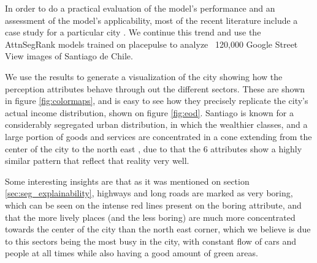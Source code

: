 In order to do a practical evaluation of the model's performance and an assessment
of the model's applicability, most of the recent literature include a case study
for  a particular city \cite{rossetti, zhang_measuring, zhang_uncovering, quercia_aesthetic,tamara_judgments,liu_machine}.
We continue this trend and use the AttnSegRank models trained on placepulse
to analyze ~120,000 Google Street View images of Santiago de Chile.

We use the results to generate a visualization of the city showing how the perception
attributes behave through out the different sectors. These are shown in figure
\ref{fig:colormaps}, and is easy to see how they precisely replicate the city's actual
income distribution, shown on figure \ref{fig:eod}. Santiago is known for a considerably
segregated urban distribution, in which the wealthier classes, and a large portion
of goods and services are concentrated in a cone extending from the center of the city
to the north east \cite{sabatini_segregacion}, due to that the 6 attributes show a
highly similar pattern that reflect that reality very well.

Some interesting insights are that as it was mentioned on section \ref{sec:seg_explainability},
highways and long roads are marked as very boring, which can be seen on the intense
red lines present on the boring attribute, and that the more lively places (and the less boring)
are much more concentrated towards the center of the city than the north east corner, which
we believe is due to this sectors being the most busy in the city, with constant flow
of cars and people at all times while also having a good amount of green areas.

